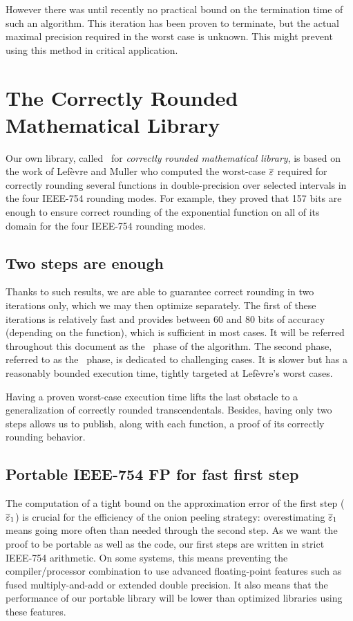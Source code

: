 However there was until recently no practical bound on the termination
time of such an algorithm. This iteration has been proven to
terminate, but the actual maximal precision required in the worst case
is unknown.  This might prevent using this method in critical
application.




\section{The Correctly Rounded Mathematical Library}
\label{section:crlibm}

Our own library, called \crlibm\ for \emph{correctly rounded
  mathematical library}, is based on the work of
Lef\`evre and Muller \cite{LMT98,Lef2000} who computed the worst-case ${\overline{\varepsilon}}$
required for correctly rounding several functions in double-precision
over selected intervals in the four IEEE-754 rounding modes. For
example, they proved that 157 bits are enough to ensure correct rounding
of the exponential function on all of its domain for the four IEEE-754
rounding modes.

\subsection{Two steps are enough}
Thanks to such results, we are able to guarantee correct rounding in
two iterations only, which we may then optimize separately. The first
of these iterations is relatively fast and provides between 60 and 80
bits of accuracy (depending on the function), which is sufficient in
most cases. It will be referred throughout this document as the \quick\ 
phase of the algorithm. The second phase, referred to as the
\accurate\ phase, is dedicated to challenging cases. It is slower but
has a reasonably bounded execution time, tightly targeted at
Lef\`evre's worst cases.

Having a proven worst-case execution time lifts the last obstacle to a
generalization of correctly rounded transcendentals. Besides, having
only two steps allows us to publish, along with each function, a proof
of its correctly rounding behavior.


\subsection{Portable IEEE-754 FP for fast first step}
The computation of a tight bound on the approximation error of the
first step (${\overline{\varepsilon}}_1$) is crucial for the efficiency of the onion
peeling strategy: overestimating ${\overline{\varepsilon}}_1$ means going more often
than needed through the second step. As we want the proof to be
portable as well as the code, our first steps are written in strict
IEEE-754 arithmetic. On some systems, this means preventing the
compiler/processor combination to use advanced floating-point features
such as fused multiply-and-add or extended double precision. It also
means that the performance of our portable library will be lower than
optimized libraries using these features.

